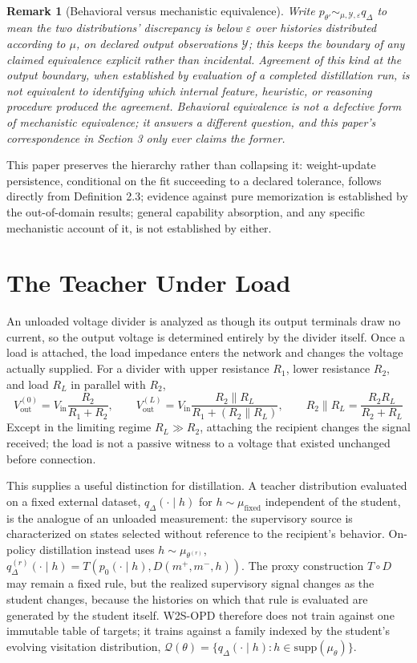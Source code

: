 \documentclass[11pt]{article}
\newtheorem{remark}[definition]{Remark}
\begin{document}
\begin{remark}[Behavioral versus mechanistic equivalence]
Write $p_{\theta'} \sim_{\mu, \mathcal{Y}, \varepsilon} q_\Delta$ to mean the two distributions' discrepancy is below $\varepsilon$ over histories distributed according to $\mu$, on declared output observations $\mathcal{Y}$; this keeps the boundary of any claimed equivalence explicit rather than incidental. Agreement of this kind at the output boundary, when established by evaluation of a completed distillation run, is not equivalent to identifying which internal feature, heuristic, or reasoning procedure produced the agreement. Behavioral equivalence is not a defective form of mechanistic equivalence; it answers a different question, and this paper's correspondence in Section 3 only ever claims the former.
\end{remark}

This paper preserves the hierarchy rather than collapsing it: weight-update persistence, conditional on the fit succeeding to a declared tolerance, follows directly from Definition 2.3; evidence against pure memorization is established by the out-of-domain results; general capability absorption, and any specific mechanistic account of it, is not established by either.

\section{The Teacher Under Load}

An unloaded voltage divider is analyzed as though its output terminals draw no current, so the output voltage is determined entirely by the divider itself. Once a load is attached, the load impedance enters the network and changes the voltage actually supplied. For a divider with upper resistance $R_1$, lower resistance $R_2$, and load $R_L$ in parallel with $R_2$,
\[
V_{\text{out}}^{(0)} = V_{\text{in}}\frac{R_2}{R_1+R_2}, \qquad V_{\text{out}}^{(L)} = V_{\text{in}}\frac{R_2 \parallel R_L}{R_1 + (R_2 \parallel R_L)}, \qquad R_2 \parallel R_L = \frac{R_2 R_L}{R_2+R_L}
\]
Except in the limiting regime $R_L \gg R_2$, attaching the recipient changes the signal received; the load is not a passive witness to a voltage that existed unchanged before connection.

This supplies a useful distinction for distillation. A teacher distribution evaluated on a fixed external dataset, $q_\Delta(\cdot \mid h)$ for $h \sim \mu_{\text{fixed}}$ independent of the student, is the analogue of an unloaded measurement: the supervisory source is characterized on states selected without reference to the recipient's behavior. On-policy distillation instead uses $h \sim \mu_{\theta^{(r)}}$, $q_\Delta^{(r)}(\cdot \mid h) = T(p_0(\cdot \mid h), D(m^{+}, m^{-}, h))$. The proxy construction $T \circ D$ may remain a fixed rule, but the realized supervisory signal changes as the student changes, because the histories on which that rule is evaluated are generated by the student itself. W2S-OPD therefore does not train against one immutable table of targets; it trains against a family indexed by the student's evolving visitation distribution, $\mathcal{Q}(\theta) = \{q_\Delta(\cdot \mid h) : h \in \text{supp}(\mu_\theta)\}$.
\end{document}
